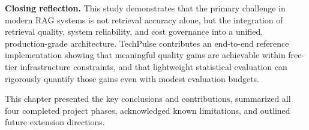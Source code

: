\medskip
\noindent\textbf{Closing reflection.} This study demonstrates that the primary challenge in modern RAG systems is not retrieval accuracy alone, but the integration of retrieval quality, system reliability, and cost governance into a unified, production-grade architecture. TechPulse contributes an end-to-end reference implementation showing that meaningful quality gains are achievable within free-tier infrastructure constraints, and that lightweight statistical evaluation can rigorously quantify those gains even with modest evaluation budgets.

\medskip
\noindent This chapter presented the key conclusions and contributions, summarized all four completed project phases, acknowledged known limitations, and outlined future extension directions.
